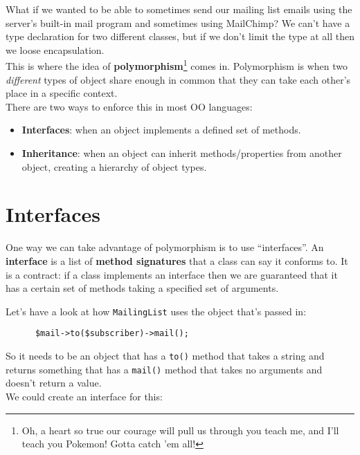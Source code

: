 What if we wanted to be able to sometimes send our mailing list emails using the server's built-in mail program and sometimes using MailChimp? We can't have a type declaration for two different classes, but if we don't limit the type at all then we loose encapsulation.
\\

This is where the idea of \textbf{polymorphism}\footnote{Oh, a heart so true our courage will pull us through you teach me, and I'll teach you Pokemon! Gotta catch 'em all!} comes in. Polymorphism is when two \textit{different} types of object share enough in common that they can take each other's place in a specific context.
\\

There are two ways to enforce this in most OO languages:

\begin{itemize}
    \item \textbf{Interfaces}: when an object implements a defined set of methods.
    \item \textbf{Inheritance}: when an object can inherit methods/properties from another object, creating a hierarchy of object types.
\end{itemize}


\section{Interfaces}

One way we can take advantage of polymorphism is to use ``interfaces''. An \textbf{interface} is a list of \textbf{method signatures} that a class can say it conforms to. It is a contract: if a class implements an interface then we are guaranteed that it has a certain set of methods taking a specified set of arguments.

\pagebreak

Let's have a look at how \texttt{MailingList} uses the object that's passed in:

\begin{verbatim}
      $mail->to($subscriber)->mail();
\end{verbatim}

So it needs to be an object that has a \texttt{to()} method that takes a string and returns something that has a \texttt{mail()} method that takes no arguments and doesn't return a value.
\\

We could create an interface for this:

